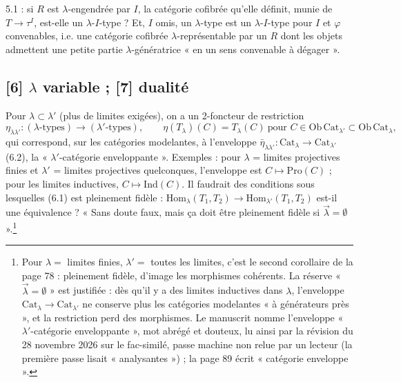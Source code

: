 \documentclass[11pt,a4paper]{article}
\begin{document}
5.1 : si $R$ est $\lambda$-engendrée par $I$, la catégorie cofibrée qu'elle
définit, munie de $T \to \tau^{I}$, est-elle un $\lambda$-$I$-type ? Et,
$I$ omis, un $\lambda$-type est un $\lambda$-$I$-type pour $I$ et $\varphi$
convenables, i.e. une catégorie cofibrée $\lambda$-représentable par un $R$
dont les objets admettent une petite partie $\lambda$-génératrice « en un
sens convenable à dégager ».

\subsection*{[6] $\lambda$ variable ; [7] dualité}

Pour $\lambda \subset \lambda'$ (plus de limites exigées), on a un
2-foncteur de restriction
\begin{equation}
\eta_{\lambda\lambda'} : (\lambda\text{-types}) \longrightarrow
(\lambda'\text{-types}), \qquad \eta(T_{\lambda})(C) = T_{\lambda}(C)
\ \text{pour } C \in \mathrm{Ob}\,\mathrm{Cat}_{\lambda'} \subset \mathrm{Ob}\,
\mathrm{Cat}_{\lambda}, \tag{6.1}
\end{equation}
qui correspond, sur les catégories modelantes, à l'enveloppe
$\bar{\eta}_{\lambda\lambda'} : \mathrm{Cat}_{\lambda} \to
\mathrm{Cat}_{\lambda'}$ (6.2), la « $\lambda'$-catégorie enveloppante ». Exemples : pour $\lambda$ = limites
projectives finies et $\lambda'$ = limites projectives quelconques,
l'enveloppe est $C \mapsto \mathrm{Pro}(C)$ ; pour les limites inductives,
$C \mapsto \mathrm{Ind}(C)$. Il faudrait des conditions sous lesquelles
(6.1) est pleinement fidèle : $\mathrm{Hom}_{\lambda}(T_{1}, T_{2}) \to
\mathrm{Hom}_{\lambda'}(T_{1}, T_{2})$ est-il une équivalence ? « Sans doute
faux, mais ça doit être pleinement fidèle si $\overrightarrow{\lambda} =
\emptyset$ ».\footnote{Pour $\lambda = $ limites finies, $\lambda' = $
toutes les limites, c'est le second corollaire de la page 78 :
pleinement fidèle, d'image les morphismes cohérents. La réserve
« $\overrightarrow{\lambda} = \emptyset$ » est justifiée : dès qu'il y a
des limites inductives dans $\lambda$, l'enveloppe $\mathrm{Cat}_{\lambda}
\to \mathrm{Cat}_{\lambda'}$ ne conserve plus les catégories modelantes
« à générateurs près », et la restriction perd des morphismes. Le
manuscrit nomme l'enveloppe « $\lambda'$-catégorie enveloppante », mot
abrégé et douteux, lu ainsi par la révision du 28 novembre 2026 sur le fac-similé, passe machine non relue par un lecteur (la première passe lisait « analysantes ») ; la
page 89 écrit « catégorie enveloppe ».}
\end{document}
